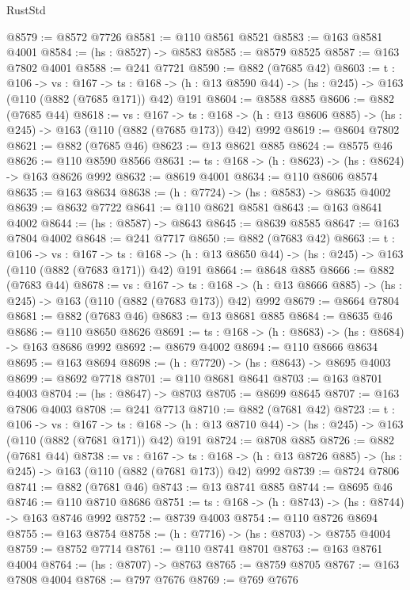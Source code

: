 \begin{lexlean}{RustStd}
\begin{coremodule}
@8579 := @8572 @7726
@8581 := @110 @8561 @8521
@8583 := @163 @8581 @4001
@8584 := (hs : @8527) -> @8583
@8585 := @8579 @8525
@8587 := @163 @7802 @4001
@8588 := @241 @7721
@8590 := @882 (@7685 @42)
@8603 := {t : @106} ->
  {vs : @167} ->
  {ts : @168} -> (h : @13 @8590 @44) -> (hs : @245) -> @163 (@110 (@882 (@7685 @171)) @42) @191
@8604 := @8588 @885
@8606 := @882 (@7685 @44)
@8618 := {vs : @167} ->
  {ts : @168} -> (h : @13 @8606 @885) -> (hs : @245) -> @163 (@110 (@882 (@7685 @173)) @42) @992
@8619 := @8604 @7802
@8621 := @882 (@7685 @46)
@8623 := @13 @8621 @885
@8624 := @8575 @46
@8626 := @110 @8590 @8566
@8631 := {ts : @168} -> (h : @8623) -> (hs : @8624) -> @163 @8626 @992
@8632 := @8619 @4001
@8634 := @110 @8606 @8574
@8635 := @163 @8634
@8638 := (h : @7724) -> (hs : @8583) -> @8635 @4002
@8639 := @8632 @7722
@8641 := @110 @8621 @8581
@8643 := @163 @8641 @4002
@8644 := (hs : @8587) -> @8643
@8645 := @8639 @8585
@8647 := @163 @7804 @4002
@8648 := @241 @7717
@8650 := @882 (@7683 @42)
@8663 := {t : @106} ->
  {vs : @167} ->
  {ts : @168} -> (h : @13 @8650 @44) -> (hs : @245) -> @163 (@110 (@882 (@7683 @171)) @42) @191
@8664 := @8648 @885
@8666 := @882 (@7683 @44)
@8678 := {vs : @167} ->
  {ts : @168} -> (h : @13 @8666 @885) -> (hs : @245) -> @163 (@110 (@882 (@7683 @173)) @42) @992
@8679 := @8664 @7804
@8681 := @882 (@7683 @46)
@8683 := @13 @8681 @885
@8684 := @8635 @46
@8686 := @110 @8650 @8626
@8691 := {ts : @168} -> (h : @8683) -> (hs : @8684) -> @163 @8686 @992
@8692 := @8679 @4002
@8694 := @110 @8666 @8634
@8695 := @163 @8694
@8698 := (h : @7720) -> (hs : @8643) -> @8695 @4003
@8699 := @8692 @7718
@8701 := @110 @8681 @8641
@8703 := @163 @8701 @4003
@8704 := (hs : @8647) -> @8703
@8705 := @8699 @8645
@8707 := @163 @7806 @4003
@8708 := @241 @7713
@8710 := @882 (@7681 @42)
@8723 := {t : @106} ->
  {vs : @167} ->
  {ts : @168} -> (h : @13 @8710 @44) -> (hs : @245) -> @163 (@110 (@882 (@7681 @171)) @42) @191
@8724 := @8708 @885
@8726 := @882 (@7681 @44)
@8738 := {vs : @167} ->
  {ts : @168} -> (h : @13 @8726 @885) -> (hs : @245) -> @163 (@110 (@882 (@7681 @173)) @42) @992
@8739 := @8724 @7806
@8741 := @882 (@7681 @46)
@8743 := @13 @8741 @885
@8744 := @8695 @46
@8746 := @110 @8710 @8686
@8751 := {ts : @168} -> (h : @8743) -> (hs : @8744) -> @163 @8746 @992
@8752 := @8739 @4003
@8754 := @110 @8726 @8694
@8755 := @163 @8754
@8758 := (h : @7716) -> (hs : @8703) -> @8755 @4004
@8759 := @8752 @7714
@8761 := @110 @8741 @8701
@8763 := @163 @8761 @4004
@8764 := (hs : @8707) -> @8763
@8765 := @8759 @8705
@8767 := @163 @7808 @4004
@8768 := @797 @7676
@8769 := @769 @7676

\end{coremodule}
\end{lexlean}
